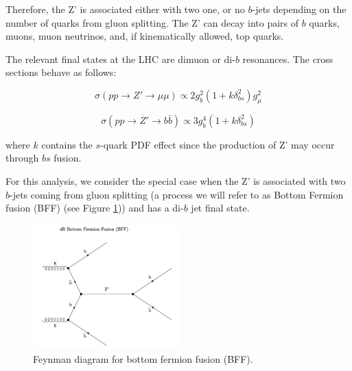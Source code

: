 Therefore, the Z' is associated either with two one, or no $b$-jets depending on the number of quarks from gluon splitting. The Z' can decay into pairs of $b$ quarks, muons, muon neutrinos, and, if kinematically allowed, top quarks. 

The relevant final states at the LHC are dimuon or di-$b$ resonances. The cross sections behave as follows:

\begin{equation}
\label{crossmu}
\sigma(pp\rightarrow Z' \rightarrow \mu\mu)\propto2g_{b}^{2}(1+k\delta_{bs}^{2})g_{\mu}^{2}
\end{equation}

\begin{equation}
\label{crossb}
\sigma(pp\rightarrow Z' \rightarrow b\bar{b})\propto3g_{b}^{4}(1+k\delta_{bs}^{2})
\end{equation}

where $k$ contains the $s$-quark PDF effect since the production of Z' may occur through $bs$ fusion.

For this analysis, we consider the special case when the Z' is associated with two $b$-jets coming from gluon splitting (a process we will refer to as Bottom Fermion fusion (BFF) (see Figure \ref{fig:bff})) and has a di-$b$ jet final state.

 \begin{figure}[H]
 	\centering
 	\includegraphics[width=0.5\textwidth]{figures/bff.png}
 	\singlespace
 	\caption{Feynman diagram for bottom fermion fusion (BFF).}
 	\label{fig:bff}
 \end{figure}


